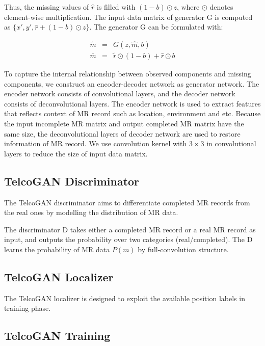 Thus, the missing values of $\hat{r}$ is filled with $(1-b)\odot z$, where $\odot$ denotes element-wise multiplication. The input data matrix of generator G is computed as $\{x', y', \hat{r}+(1-b)\odot z\}$. The generator G can be formulated with:

\begin{eqnarray}
  \tilde{m} &=& G(z, \hat{m}, b) \\
  \bar{m}   &=& \tilde{r}\odot (1-b) + \hat{r}\odot b
\end{eqnarray}

To capture the internal relationship between observed components and missing components, we construct an encoder-decoder network as generator network. The encoder network consists of convolutional layers, and the decoder network consists of deconvolutional layers. The encoder network is used to extract features that reflects context of MR record such as location, environment and etc. Because the input incomplete MR matrix and output completed MR matrix have the same size, the deconvolutional layers of decoder network are used to restore information of MR record. We use convolution kernel with $3\times 3$ in convolutional layers to reduce the size of input data matrix.

\subsection{TelcoGAN Discriminator}
The TelcoGAN discriminator aims to differentiate completed MR records from the real ones by modelling the distribution of MR data.

The discriminator D takes either a completed MR record or a real MR record as input, and outputs the probability over two categories (real/completed). The D learns the probability of MR data $P(m)$ by full-convolution structure.

\subsection{TelcoGAN Localizer}
The TelcoGAN localizer is designed to exploit the available position labels in training phase. 

\subsection{TelcoGAN Training}
